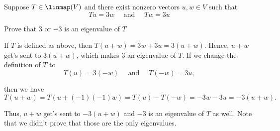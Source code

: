 \begin{xrcs}
  Suppose $T \in \linmap(V)$ and there exist nonzero vectors $u, w \in V$ such that
  \begin{equation}
    Tu = 3w \quad \text{ and } \quad Tw = 3u
  \end{equation}

  Prove that $3$ or $-3$ is an eigenvalue of $T$

  \begin{xsol}
    If $T$ is defined as above, then $T(u+w) = 3w + 3u = 3(u+w)$. Hence, $u+w$ get's sent to $3(u+w)$, which makes $3$ an eigenvalue of $T$. If we change the definition of $T$ to
    \begin{equation}
      T(u) = 3(-w) \quad \text{ and } \quad T(-w) = 3u,
    \end{equation}

    then we have
    \begin{equation}
      T(u+w) = T(u + (-1)(-1)w) = T(u) - T(-w) = -3w -3u = -3 (u+w).
    \end{equation}

    Thus, $u+w$ get's sent to $-3 (u+w)$ and $-3$ is an eigenvalue of $T$ as well. Note that we didn't prove that those are the only eigenvalues.
  \end{xsol}
\end{xrcs}

